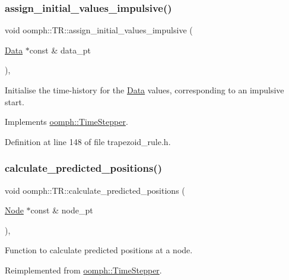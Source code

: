 \subsubsection{\texorpdfstring{assign\+\_\+initial\+\_\+values\+\_\+impulsive()}{assign\_initial\_values\_impulsive()}}
{\footnotesize\ttfamily void oomph\+::\+T\+R\+::assign\+\_\+initial\+\_\+values\+\_\+impulsive (\begin{DoxyParamCaption}\item[{\hyperlink{classoomph_1_1Data}{Data} $\ast$const \&}]{data\+\_\+pt }\end{DoxyParamCaption})\hspace{0.3cm}{\ttfamily [inline]}, {\ttfamily [virtual]}}



Initialise the time-\/history for the \hyperlink{classoomph_1_1Data}{Data} values, corresponding to an impulsive start. 



Implements \hyperlink{classoomph_1_1TimeStepper_a7e894df13c88c96dd8eced2700228225}{oomph\+::\+Time\+Stepper}.



Definition at line 148 of file trapezoid\+\_\+rule.\+h.

\mbox{\label{classoomph_1_1TR_a5ef44b410f646c0f94eb2f5a2d80bb03}} 
\subsubsection{\texorpdfstring{calculate\+\_\+predicted\+\_\+positions()}{calculate\_predicted\_positions()}}
{\footnotesize\ttfamily void oomph\+::\+T\+R\+::calculate\+\_\+predicted\+\_\+positions (\begin{DoxyParamCaption}\item[{\hyperlink{classoomph_1_1Node}{Node} $\ast$const \&}]{node\+\_\+pt }\end{DoxyParamCaption})\hspace{0.3cm}{\ttfamily [inline]}, {\ttfamily [virtual]}}



Function to calculate predicted positions at a node. 



Reimplemented from \hyperlink{classoomph_1_1TimeStepper_a2e7fafceb9330ac971078cf9dc248701}{oomph\+::\+Time\+Stepper}.



